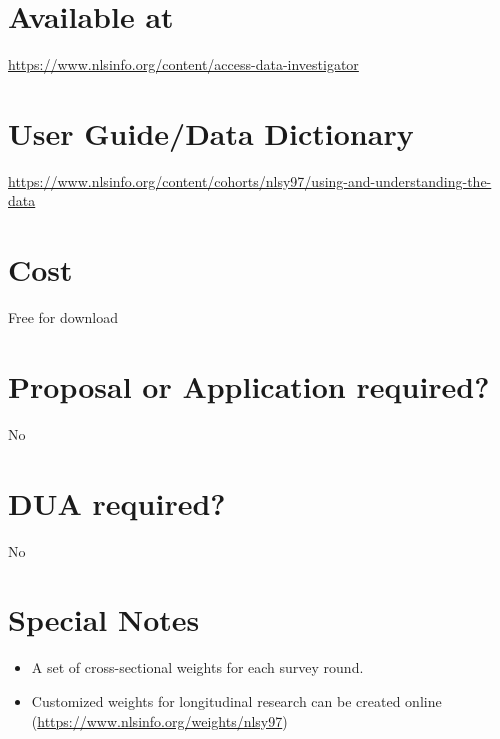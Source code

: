 \documentclass[
]{book}
\providecommand{\tightlist}{%
  \setlength{\itemsep}{0pt}\setlength{\parskip}{0pt}}
\begin{document}
\hypertarget{available-at-60}{%
\section{Available at}\label{available-at-60}}

\url{https://www.nlsinfo.org/content/access-data-investigator}

\hypertarget{user-guidedata-dictionary-60}{%
\section{User Guide/Data Dictionary}\label{user-guidedata-dictionary-60}}

\url{https://www.nlsinfo.org/content/cohorts/nlsy97/using-and-understanding-the-data}

\hypertarget{cost-60}{%
\section{Cost}\label{cost-60}}

Free for download

\hypertarget{proposal-or-application-required-60}{%
\section{Proposal or Application required?}\label{proposal-or-application-required-60}}

No

\hypertarget{dua-required-60}{%
\section{DUA required?}\label{dua-required-60}}

No

\hypertarget{special-notes-60}{%
\section{Special Notes}\label{special-notes-60}}

\begin{itemize}
\tightlist
\item
  A set of cross-sectional weights for each survey round.
\item
  Customized weights for longitudinal research can be created online (\url{https://www.nlsinfo.org/weights/nlsy97})
\end{itemize}

\mainmatter
\end{document}
